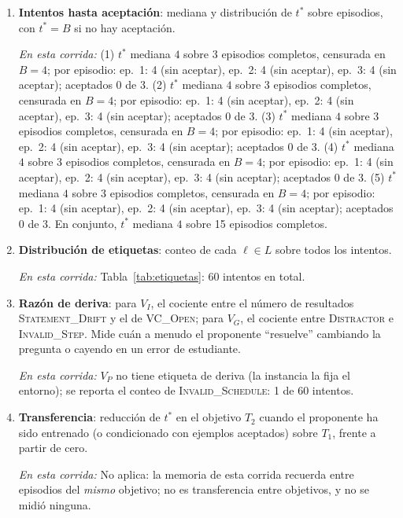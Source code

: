 \documentclass[11pt,a4paper]{article}
\begin{document}
\begin{enumerate}

  \item \textbf{Intentos hasta aceptación}: mediana y distribución de $t^*$ sobre episodios, con $t^* = B$ si no hay aceptación.

  \emph{En esta corrida:} (1) $t^*$ mediana $4$ sobre 3 episodios completos, censurada en $B = 4$; por episodio: ep.~1: 4 (sin aceptar), ep.~2: 4 (sin aceptar), ep.~3: 4 (sin aceptar); aceptados 0 de 3. (2) $t^*$ mediana $4$ sobre 3 episodios completos, censurada en $B = 4$; por episodio: ep.~1: 4 (sin aceptar), ep.~2: 4 (sin aceptar), ep.~3: 4 (sin aceptar); aceptados 0 de 3. (3) $t^*$ mediana $4$ sobre 3 episodios completos, censurada en $B = 4$; por episodio: ep.~1: 4 (sin aceptar), ep.~2: 4 (sin aceptar), ep.~3: 4 (sin aceptar); aceptados 0 de 3. (4) $t^*$ mediana $4$ sobre 3 episodios completos, censurada en $B = 4$; por episodio: ep.~1: 4 (sin aceptar), ep.~2: 4 (sin aceptar), ep.~3: 4 (sin aceptar); aceptados 0 de 3. (5) $t^*$ mediana $4$ sobre 3 episodios completos, censurada en $B = 4$; por episodio: ep.~1: 4 (sin aceptar), ep.~2: 4 (sin aceptar), ep.~3: 4 (sin aceptar); aceptados 0 de 3. En conjunto, $t^*$ mediana $4$ sobre 15 episodios completos.

  \item \textbf{Distribución de etiquetas}: conteo de cada $\ell \in L$ sobre todos los intentos.

  \emph{En esta corrida:} Tabla~\ref{tab:etiquetas}: 60 intentos en total.

  \item \textbf{Razón de deriva}: para $V_I$, el cociente entre el número de resultados \textsc{Statement\_Drift} y el de \textsc{VC\_Open}; para $V_G$, el cociente entre \textsc{Distractor} e \textsc{Invalid\_Step}. Mide cuán a menudo el proponente ``resuelve'' cambiando la pregunta o cayendo en un error de estudiante.

  \emph{En esta corrida:} $V_P$ no tiene etiqueta de deriva (la instancia la fija el entorno); se reporta el conteo de \textsc{Invalid\_Schedule}: 1 de 60 intentos.

  \item \textbf{Transferencia}: reducción de $t^*$ en el objetivo $T_2$ cuando el proponente ha sido entrenado (o condicionado con ejemplos aceptados) sobre $T_1$, frente a partir de cero.

  \emph{En esta corrida:} No aplica: la memoria de esta corrida recuerda entre episodios del \emph{mismo} objetivo; no es transferencia entre objetivos, y no se midió ninguna.


\end{enumerate}
\end{document}
